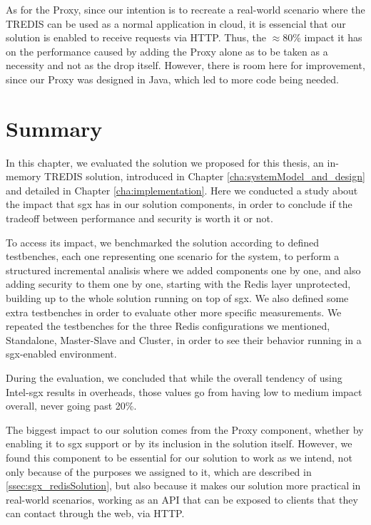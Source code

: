 As for the Proxy, since our intention is to recreate a real-world scenario where the TREDIS can be used as a normal application in cloud, it is essencial that our solution is enabled to receive requests via HTTP. Thus, the $\approx$80\% impact it has on the performance caused by adding the Proxy alone as to be taken as a necessity and not as the drop itself. However, there is room here for improvement, since our Proxy was designed in Java, which led to more code being needed. 

\section{Summary}

In this chapter, we evaluated the solution we proposed for this thesis, an in-memory TREDIS solution, introduced in Chapter \ref{cha:systemModel_and_design} and detailed in Chapter \ref{cha:implementation}. Here we conducted a study about the impact that \gls{sgx} has in our solution components, in order to conclude if the tradeoff between performance and security is worth it or not. 

To access its impact, we benchmarked the solution according to defined testbenches, each one representing one scenario for the system, to perform a structured incremental analisis where we added components one by one, and also adding security to them one by one, starting with the Redis layer unprotected, building up to the whole solution running on top of \gls{sgx}. We also defined some extra testbenches in order to evaluate other more specific measurements. We repeated the testbenches for the three Redis configurations we mentioned, Standalone, Master-Slave and Cluster, in order to see their behavior running in a \gls{sgx}-enabled environment.

During the evaluation, we concluded that while the overall tendency of using Intel-\gls{sgx} results in overheads, those values go from having low to medium impact overall, never going past 20\%. 

The biggest impact to our solution comes from the Proxy component, whether by enabling it to \gls{sgx} support or by its inclusion in the solution itself. However, we found this component to be essential for our solution to work as we intend, not only because of the purposes we assigned to it, which are described in \ref{ssec:sgx_redisSolution}, but also because it makes our solution more practical in real-world scenarios, working as an API that can be exposed to clients that they can contact through the web, via HTTP.


